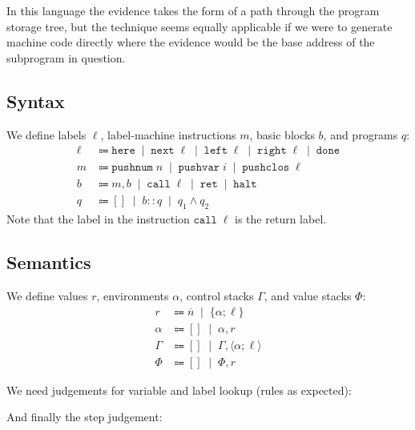 \documentclass[12pt]{article}
\newcommand{\tup}[1]{\langle #1 \rangle}
\newcommand{\set}[1]{\{ #1 \}}
\newcommand{\alt}{\;\; | \;\;}
\newcommand{\defi}{\Coloneqq}
\newcommand{\nil}{[]}
\newcommand{\h}[1]{\hat{#1}}
\newcommand{\n}[1]{\overline{#1}}
\newcommand{\mpushnum}[1]{\mathtt{pushnum} \; #1}
\newcommand{\mhalt}{\mathtt{halt}}
\newcommand{\mpushvar}[1]{\mathtt{pushvar} \; #1}
\newcommand{\mpushclos}[1]{\mathtt{pushclos} \; #1}
\newcommand{\mcall}[1]{\mathtt{call} \; #1}
\newcommand{\mret}{\mathtt{ret}}
\newcommand{\lhere}{\mathtt{here}}
\newcommand{\lnext}{\mathtt{next}}
\newcommand{\lleft}{\mathtt{left}}
\newcommand{\lright}{\mathtt{right}}
\newcommand{\ldone}{\mathtt{done}}
\newcommand{\judgement}[1]{\noindent \framebox{#1}}
\newcommand{\e}{e} %
\renewcommand{\b}{b} %
\newcommand{\q}{q}
\renewcommand{\r}{r}
\newcommand{\m}{m}
\renewcommand{\h}{h}
\renewcommand{\l}{\ell}
\newcommand{\mnil}{[]}
\newcommand{\mcons}{::}
\newcommand{\mnode}{\wedge}
\begin{document}
In this language the evidence takes the form of a path through the program storage tree, but the technique seems equally applicable if we were to generate machine code directly where the evidence would be the base address of the subprogram in question.

\subsection*{Syntax}

We define labels $\l$, label-machine instructions $\m$, basic blocks $\b$, and programs $\q$:
\begin{align*}
  \l &\defi \lhere \alt \lnext \; \l \alt \lleft \; \l \alt \lright \; \l \alt \ldone \\
  \m &\defi \mpushnum{n} \alt \mpushvar{i} \alt \mpushclos{\l} \\
  \b &\defi \m, \b \alt \mcall{\l} \alt \mret \alt \mhalt \\
  \q &\defi \mnil \alt \b \mcons \q \alt \q_1 \mnode \q_2
\end{align*}
Note that the label in the instruction $\mcall{\l}$ is the return label.

\subsection*{Semantics}

We define values $\r$, environments $\alpha$, control stacks $\Gamma$, and value stacks $\Phi$:
\begin{align*}
  \r &\defi \n{n} \alt \set{\alpha; \l} \\
  \alpha &\defi \nil \alt \alpha, \r \\
  \Gamma &\defi \nil \alt \Gamma, \tup{\alpha; \l} \\
  \Phi &\defi \nil \alt \Phi, \r
\end{align*}

We need judgements for variable and label lookup (rules as expected):

\vspace{0.5cm}
\judgement{$\alpha \vdash i \downarrow \r$}

\vspace{0.5cm}
\judgement{$\q \vdash \l \uparrow \b$}
\vspace{0.5cm}

And finally the step judgement:

\newcommand{\mstep}[7]{\ensuremath{#1 \vdash \tup{#2; #3; #4} \rightarrow \tup{#5; #6; #7}}}
\newcommand{\msteps}[7]{\ensuremath{#1 \vdash \tup{#2; #3; #4} \rightarrow^* \tup{#5; #6; #7}}}
\end{document}
